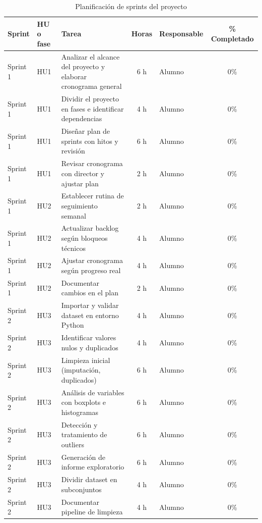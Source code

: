 \documentclass[
11pt, %
]{charter}
\begin{document}
\begin{table}[htpb]
\centering
\caption{Planificación de sprints del proyecto}
\begin{tabularx}{\linewidth}{@{}|l|l|X|c|l|c|@{}}
\hline
\rowcolor[HTML]{C0C0C0}
Sprint & HU o fase & Tarea & Horas & Responsable & \% Completado \\ \hline

Sprint 1 & HU1 & Analizar el alcance del proyecto y elaborar cronograma general & 6 h & Alumno & 0\% \\ \hline
Sprint 1 & HU1 & Dividir el proyecto en fases e identificar dependencias & 4 h & Alumno & 0\% \\ \hline
Sprint 1 & HU1 & Diseñar plan de sprints con hitos y revisión & 6 h & Alumno & 0\% \\ \hline
Sprint 1 & HU1 & Revisar cronograma con director y ajustar plan & 2 h & Alumno & 0\% \\ \hline
Sprint 1 & HU2 & Establecer rutina de seguimiento semanal & 2 h & Alumno & 0\% \\ \hline
Sprint 1 & HU2 & Actualizar backlog según bloqueos técnicos & 4 h & Alumno & 0\% \\ \hline
Sprint 1 & HU2 & Ajustar cronograma según progreso real & 4 h & Alumno & 0\% \\ \hline
Sprint 1 & HU2 & Documentar cambios en el plan & 2 h & Alumno & 0\% \\ \hline

Sprint 2 & HU3 & Importar y validar dataset en entorno Python & 4 h & Alumno & 0\% \\ \hline
Sprint 2 & HU3 & Identificar valores nulos y duplicados & 4 h & Alumno & 0\% \\ \hline
Sprint 2 & HU3 & Limpieza inicial (imputación, duplicados) & 6 h & Alumno & 0\% \\ \hline
Sprint 2 & HU3 & Análisis de variables con boxplots e histogramas & 6 h & Alumno & 0\% \\ \hline
Sprint 2 & HU3 & Detección y tratamiento de outliers & 6 h & Alumno & 0\% \\ \hline
Sprint 2 & HU3 & Generación de informe exploratorio & 6 h & Alumno & 0\% \\ \hline
Sprint 2 & HU3 & Dividir dataset en subconjuntos & 4 h & Alumno & 0\% \\ \hline
Sprint 2 & HU3 & Documentar pipeline de limpieza & 4 h & Alumno & 0\% \\ \hline


\end{tabularx}
\end{table}
\end{document}
